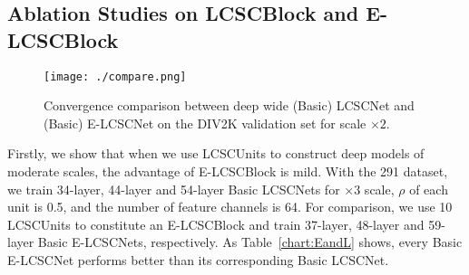 \documentclass[journal]{IEEEtran}
\begin{document}
\begin{table}[htbp]
\centering
{}
\end{table}


\subsection{Ablation Studies on LCSCBlock and E-LCSCBlock} \label{s:s_5::E}

\begin{figure}[htbp]
\centering
\texttt{[image: ./compare.png]}
\caption{\small Convergence comparison between deep wide (Basic) LCSCNet and (Basic) E-LCSCNet on the DIV2K validation set for scale $\times 2$.}
\label{fig:elcsc}
\end{figure} 

Firstly, we show that when we use LCSCUnits to construct deep models of moderate scales, the advantage of E-LCSCBlock is mild. With the 291 dataset, we train 34-layer, 44-layer and 54-layer Basic LCSCNets for $\times 3$ scale, $\rho$ of each unit is 0.5, and the number of feature channels is 64. For comparison, we use 10 LCSCUnits to constitute an E-LCSCBlock and train 37-layer, 48-layer and 59-layer Basic E-LCSCNets, respectively. As Table~\ref{chart:EandL} shows, every Basic E-LCSCNet performs  better than its corresponding Basic LCSCNet. 
\end{document}
